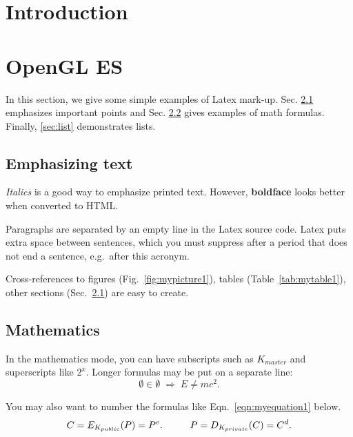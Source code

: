 \documentclass[a4paper,12pt]{article}
\begin{document}


\section{Introduction} 



\pagebreak[3]
\section{OpenGL ES}

In this section, we give some simple examples of Latex mark-up. Sec. \ref{sec:emphasis} emphasizes important points and
Sec. \ref{sec:math} gives examples of math formulas. Finally, \ref{sec:list} demonstrates lists.



\subsection{Emphasizing text}\label{sec:emphasis}

\textit{Italics} is a good way to emphasize printed text. However,
\textbf{boldface} looks better when converted to HTML.

Paragraphs are separated by an empty line in the Latex source code.
Latex puts extra space between sentences, which you must suppress
after a period that does not end a sentence, e.g.\ after this acronym.

Cross-references to figures (Fig.~\ref{fig:mypicture1}), tables
(Table~\ref{tab:mytable1}), other sections (Sec.~\ref{sec:emphasis})
are easy to create. 


\subsection{Mathematics}\label{sec:math}

In the mathematics mode, you can have subscripts such as $K_{master}$
and superscripts like $2^x$. Longer formulas may be put on a separate
line:
\[ \emptyset \in \emptyset \; \Rightarrow \; E \neq mc^2. \]

You may also want to number the formulas like Eqn.~\ref{eqn:myequation1}
below.
\begin{equation}\label{eqn:myequation1}
C = E_{K_{public}}(P) = P^e. \hspace{10mm}   P = D_{K_{private}}(C) = C^d.
\end{equation}
\end{document}
